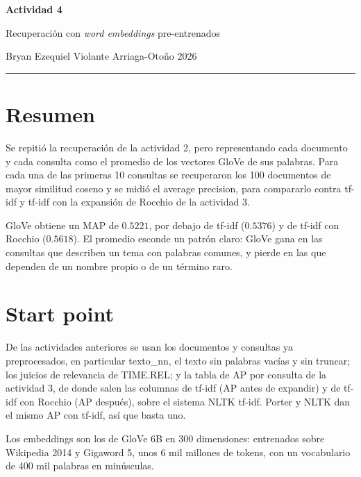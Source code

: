 \documentclass[11pt,letterpaper]{article}
\newcommand{\periodo}{Otoño 2026}
\newcommand{\alumno}{Bryan Ezequiel Violante Arriaga}
\begin{document}

\begin{center}
  {\LARGE\bfseries Actividad 4\par}
  \vspace{0.3em}
  {\large Recuperación con \textit{word embeddings}
   pre-entrenados\par}
  \vspace{0.5em}
  {\small \alumno \quad-\quad \periodo\par}
  \vspace{0.4em}
  \rule{\linewidth}{0.5pt}
\end{center}

\section*{Resumen}

Se repitió la recuperación de la actividad 2, pero representando cada
documento y cada consulta como el promedio de los vectores GloVe de
sus palabras. Para cada una de las primeras 10 consultas se
recuperaron los 100 documentos de mayor similitud coseno y se midió el
average precision, para compararlo contra tf-idf y tf-idf con la
expansión de Rocchio de la actividad 3.

GloVe obtiene un MAP de $0.5221$, por debajo de tf-idf ($0.5376$) y de
tf-idf con Rocchio ($0.5618$). El promedio esconde un patrón claro:
GloVe gana en las consultas que describen un tema con palabras
comunes, y pierde en las que dependen de un nombre propio o de un
término raro.

\section{Start point}

De las actividades anteriores se usan los documentos y consultas
ya preprocesados, en particular texto\_nn, el texto sin
palabras vacías y sin truncar; los juicios de relevancia de
TIME.REL; y la tabla de AP por consulta de la actividad 3,
de donde salen las columnas de tf-idf (AP antes de expandir) y de
tf-idf con Rocchio (AP después), sobre el sistema NLTK tf-idf. Porter
y NLTK dan el mismo AP con tf-idf, así que basta uno.

Los embeddings son los de GloVe 6B en 300 dimensiones: entrenados
sobre Wikipedia 2014 y Gigaword 5, unos 6 mil millones de tokens, con
un vocabulario de 400 mil palabras en minúsculas.
\end{document}
